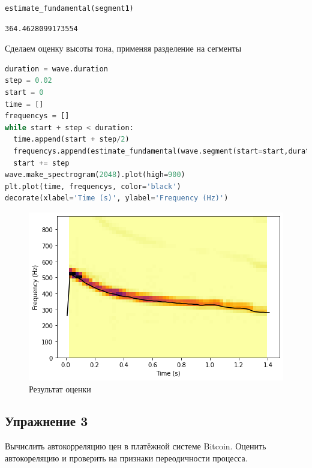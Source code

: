 \begin{lstlisting}[language=Python]
estimate_fundamental(segment1)
\end{lstlisting}
\begin{lstlisting}
364.4628099173554
\end{lstlisting}

Сделаем оценку высоты тона, применяя разделение на сегменты

\begin{lstlisting}[language=Python]
duration = wave.duration
step = 0.02
start = 0
time = []
frequencys = []
while start + step < duration:
  time.append(start + step/2)
  frequencys.append(estimate_fundamental(wave.segment(start=start,duration=step)))
  start += step
wave.make_spectrogram(2048).plot(high=900)
plt.plot(time, frequencys, color='black')
decorate(xlabel='Time (s)', ylabel='Frequency (Hz)')
\end{lstlisting}
\begin{figure}[H]
	\begin{center}
		\includegraphics[scale=1]{fig/lab05/lab05_4.png}
		\caption{Результат оценки}
	\end{center}
\end{figure}

\subsection{Упражнение 3}

Вычислить автокорреляцию цен в платёжной системе Bitcoin. Оценить автокореляцию и проверить на признаки переодичности процесса.

